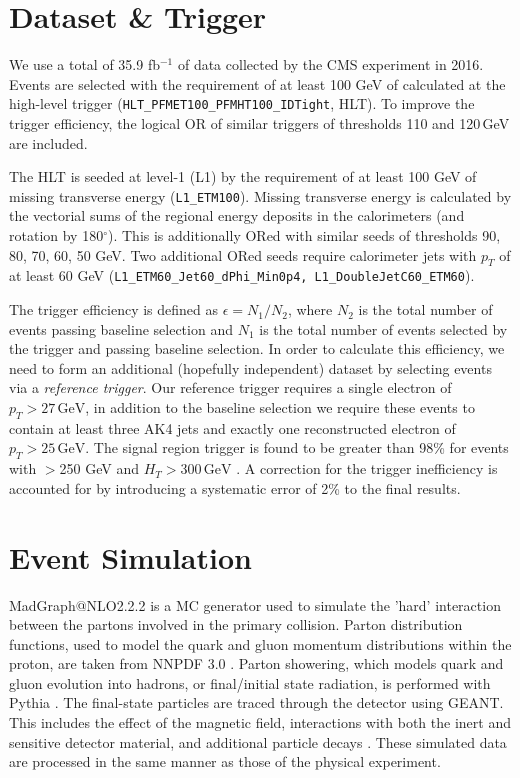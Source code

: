 \section{Dataset \& Trigger}

We use a total of 35.9 fb$^{-1}$ of data collected by the CMS experiment in 2016. Events are selected with the requirement of at least 100 GeV of \ptmiss calculated at the high-level trigger (\texttt{HLT\_PFMET100\_PFMHT100\_IDTight}, HLT). To improve the trigger efficiency, the logical OR of similar triggers of thresholds 110 and 120$\,$GeV are included.

The HLT is seeded at level-1 (L1) by the requirement of at least 100 GeV of missing transverse energy (\texttt{L1\_ETM100}). Missing transverse energy is calculated by the vectorial sums of the regional energy deposits in the calorimeters (and rotation by 180$^{\circ}$). This is additionally ORed with similar seeds of thresholds 90, 80, 70, 60, 50 GeV. Two additional ORed seeds require calorimeter jets with $p_{T}$ of at least 60 GeV (\texttt{L1\_ETM60\_Jet60\_dPhi\_Min0p4, L1\_DoubleJetC60\_ETM60}).

The trigger efficiency is defined as $\epsilon = N_{1}/N_{2}$, where $N_{2}$ is the total number of events passing baseline selection and $N_{1}$ is the total number of events selected by the trigger and passing baseline selection. In order to calculate this efficiency, we need to form an additional (hopefully independent) dataset by selecting events via a \textit{reference trigger}. Our reference trigger requires a single electron of $p_{T}>27\,\textrm{GeV}$, in addition to the baseline selection we require these events to contain at least three AK4 jets and exactly one reconstructed electron of $p_{T}>25\,\textrm{GeV}$. The signal region trigger is found to be greater than 98\% for events with \ptmiss$>$250 GeV and $H_{T}>300\,\textrm{GeV}$ \cite{CMS-SUS-16-033}. A correction for the trigger inefficiency is accounted for by introducing a systematic error of 2\% to the final results.

\section{Event Simulation}

MadGraph@NLO2.2.2 \cite{Alwall:2014hca} is a MC generator used to simulate the 'hard' interaction between the partons involved in the primary collision. Parton distribution functions, used to model the quark and gluon momentum distributions within the proton, are taken from NNPDF 3.0 \cite{Ball:2014uwa}. Parton showering, which models quark and gluon evolution into hadrons, or final/initial state radiation, is performed with Pythia \cite{pythiacite}. The final-state particles are traced through the detector using GEANT. This includes the effect of the magnetic field, interactions with both the inert and sensitive detector material, and additional particle decays \cite{Agostinelli:2002hh}. These simulated data are processed in the same manner as those of the physical experiment.

